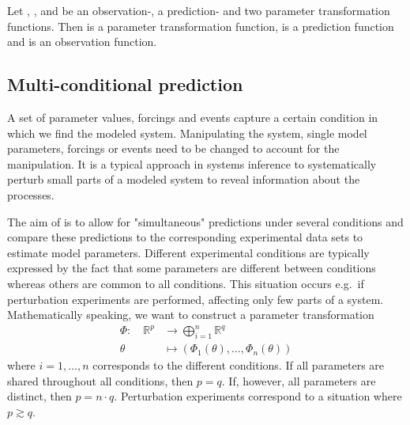 \documentclass[article]{jss}
\begin{document}
Let , ,  and  be an observation-, a prediction- and two parameter transformation functions. Then  is a parameter transformation function,  is a prediction function and  is an observation function.

\subsection{Multi-conditional prediction}

A set of parameter values, forcings and events capture a certain condition in which we find the modeled system. Manipulating the system, single model parameters, forcings or events need to be changed to account for the manipulation. It is a typical approach in systems inference to systematically perturb small parts of a modeled system to reveal information about the processes.

The aim of  is to allow for "simultaneous" predictions under several conditions and compare these predictions to the corresponding experimental data sets to estimate model parameters.
Different experimental conditions are typically expressed by the fact that some parameters are different between conditions whereas others are common to all conditions. This situation occurs e.g.~if perturbation experiments are performed, affecting only few parts of a system.
Mathematically speaking, we want to construct a parameter transformation
\begin{equation}
	\begin{aligned}
		\Phi:\quad \mathbb R^p & \longrightarrow  \bigoplus_{i = 1}^n \mathbb R^q \\
		\theta & \longmapsto  \left(\Phi_1(\theta), \dots, \Phi_n(\theta)\right)
	\end{aligned}
	\label{eq:partrafo}
\end{equation}
where $i = 1, \dots, n$ corresponds to the different conditions. If all parameters are shared throughout all conditions, then $p = q$. If, however, all parameters are distinct, then $p = n\cdot q$. Perturbation experiments correspond to a situation where $p\gtrsim q$.
\end{document}

